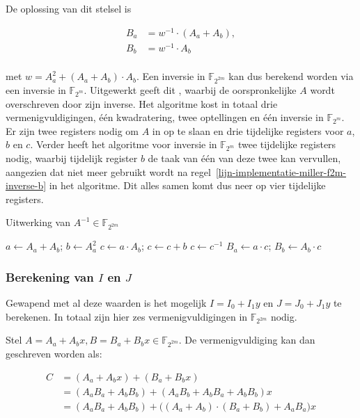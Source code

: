 De oplossing van dit stelsel is

\[\begin{aligned}
B_a	&= w^{-1} \cdot (A_a + A_b),\\
B_b	&= w^{-1} \cdot A_b\\
\end{aligned}\]

met $w = A_a^2 + (A_a + A_b) \cdot A_b$. Een inversie in $\mathbb{F}_{2^{2m}}$ kan dus berekend worden via een inversie in $\mathbb{F}_{2^m}$. Uitgewerkt geeft dit , waarbij de oorspronkelijke $A$ wordt overschreven door zijn inverse. Het algoritme kost in totaal drie vermenigvuldigingen, \'e\'en kwadratering, twee optellingen en \'e\'en inversie in $\mathbb{F}_{2^m}$. Er zijn twee registers nodig om $A$ in op te slaan en drie tijdelijke registers voor $a$, $b$ en $c$. Verder heeft het algoritme voor inversie in $\mathbb{F}_{2^m}$ twee tijdelijke registers nodig, waarbij tijdelijk register $b$ de taak van \'e\'en van deze twee kan vervullen, aangezien dat niet meer gebruikt wordt na regel~\ref{lijn-implementatie-miller-f2m-inverse-b} in het algoritme. Dit alles samen komt dus neer op vier tijdelijke registers.

\begin{algorithm}[h]
	\caption{Uitwerking van $A^{-1} \in \mathbb{F}_{2^{2m}}$}
	\label{algoritme-implementatie-miller-f2m-inverse}
	$a \gets A_a + A_b$; $b \gets A_a^2$\;
	$c \gets a \cdot A_b$; $c \gets c + b$\;
	$c \gets c^{-1}$\;
	$B_a \gets a \cdot c$; $B_b \gets A_b \cdot c$\;
\end{algorithm}

\subsubsection{Berekening van $I$ en $J$}

Gewapend met al deze waarden is het mogelijk $I = I_0 + I_1 y$ en $J = J_0 + J_1 y$ te berekenen. In totaal zijn hier zes vermenigvuldigingen in $\mathbb{F}_{2^{2m}}$ nodig. 

Stel $A = A_a + A_b x, B = B_a + B_b x \in \mathbb{F}_{2^{2m}}$. De vermenigvuldiging kan dan geschreven worden als:

\[\begin{aligned}
C	&= (A_a + A_b x) + (B_a + B_b x)\\
	&= (A_a B_a + A_b B_b) + (A_a B_b + A_b B_a + A_b B_b)x\\
	&= (A_a B_a + A_b B_b) + \bigl( (A_a + A_b) \cdot (B_a + B_b) + A_a B_a \bigr) x\\
\end{aligned}\]

